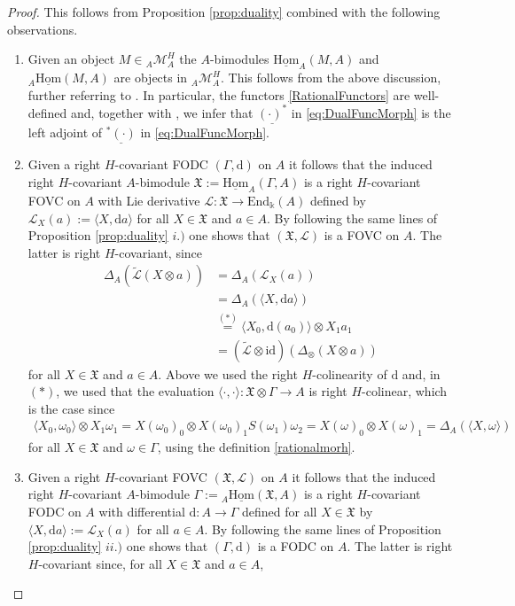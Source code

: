 \documentclass{article}
\theoremstyle{definition}
\begin{document}
	\begin{proof}
		This follows from Proposition \ref{prop:duality} combined with the following observations.
		\begin{enumerate}
			\item[i.)] Given an object $M\in{}_A\mathcal{M}_A^H$ the $A$-bimodules $\underline{\mathrm{Hom}}_A(M,A)$ and ${}_A\underline{\mathrm{Hom}}(M,A)$ are objects in ${}_A\mathcal{M}_A^H$. This follows from the above discussion, further referring to \cite[Section 2.2]{PaoloThomas}. In particular, the functors \eqref{RationalFunctors} are well-defined and, together with \cite[Proposition 9]{PoinsotPorst}, we infer that $\underline{(\cdot)^*}$ in \eqref{eq:DualFuncMorph} is the left adjoint of $\underline{{}^*(\cdot)}$ in \eqref{eq:DualFuncMorph}.
			\item[ii.)] Given a right $H$-covariant FODC $(\Gamma,\mathrm{d})$ on $A$ it follows that the induced right $H$-covariant $A$-bimodule $\mathfrak{X}:=\underline{\mathrm{Hom}}_A(\Gamma,A)$ is a right $H$-covariant FOVC on $A$ with Lie derivative $\mathscr{L}\colon\mathfrak{X}\to\mathrm{End}_\Bbbk(A)$ defined by $\mathscr{L}_X(a):=\langle X,\mathrm{d}a\rangle$ for all $X\in\mathfrak{X}$ and $a\in A$. By following the same lines of Proposition \ref{prop:duality} $i.)$ one shows that $(\mathfrak{X},\mathscr{L})$ is a FOVC on $A$. The latter is right $H$-covariant, since
			\begin{align*}
				\Delta_A(\widetilde{\mathscr{L}}(X\otimes a))
				&=\Delta_A(\mathscr{L}_X(a))\\
				&=\Delta_A(\langle X,\mathrm{d}a\rangle)\\
				&\overset{(*)}{=}\langle X_0,\mathrm{d}(a_0)\rangle\otimes X_1a_1\\
				&=(\widetilde{\mathscr{L}}\otimes\mathrm{id})(\Delta_\otimes(X\otimes a))
			\end{align*}
			for all $X\in\mathfrak{X}$ and $a\in A$. Above we used the right $H$-colinearity of $\mathrm{d}$ and, in $(*)$, we used that the evaluation $\langle\cdot,\cdot\rangle\colon\mathfrak{X}\otimes\Gamma\to A$ is right $H$-colinear, which is the case since
			\begin{align*}
				\langle X_0,\omega_0\rangle\otimes X_1\omega_1
				=X(\omega_0)_0\otimes X(\omega_0)_1S(\omega_1)\omega_2
				=X(\omega)_0\otimes X(\omega)_1
				=\Delta_A(\langle X,\omega\rangle)
			\end{align*}
			for all $X\in\mathfrak{X}$ and $\omega\in\Gamma$, using the definition \eqref{rationalmorh}.
			\item[iii.)] Given a right $H$-covariant FOVC $(\mathfrak{X},\mathscr{L})$ on $A$ it follows that the induced right $H$-covariant $A$-bimodule $\Gamma:={}_A\underline{\mathrm{Hom}}(\mathfrak{X},A)$ is a right $H$-covariant FODC on $A$ with differential $\mathrm{d}\colon A\to\Gamma$ defined for all $X\in\mathfrak{X}$ by $\langle X,\mathrm{d}a\rangle:=\mathscr{L}_X(a)$ for all $a\in A$. By following the same lines of Proposition \ref{prop:duality} $ii.)$ one shows that $(\Gamma,\mathrm{d})$ is a FODC on $A$. The latter is right $H$-covariant since, for all $X\in\mathfrak{X}$ and $a\in A$,

\end{enumerate}
\end{proof}
\end{document}
